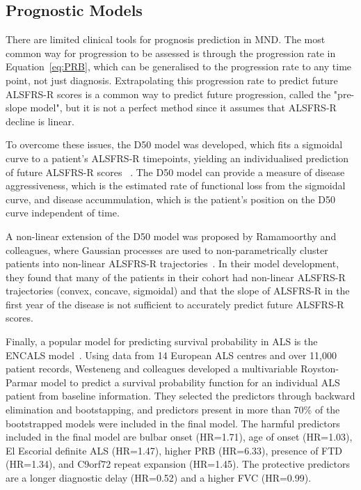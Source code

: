 \subsection{Prognostic Models}
There are limited clinical tools for prognosis prediction in MND. The most common way for progression to be assessed is through the progression rate in Equation~\ref{eq:PRB}, which can be generalised to the progression rate to any time point, not just diagnosis.
Extrapolating this progression rate to predict future ALSFRS-R scores is a common way to predict future progression, called the "pre-slope model", but it is not a perfect method since it assumes that ALSFRS-R decline is linear.

To overcome these issues, the D50 model was developed, which fits a sigmoidal curve to a patient's ALSFRS-R timepoints, yielding an individualised prediction of future ALSFRS-R scores
~\cite{poesenNeurofilamentMarkersALS2017, steinbachApplyingD50Disease2020}.
The D50 model can provide a measure of disease aggressiveness, which is the estimated rate of functional loss from the sigmoidal curve, and disease accummulation, which is the patient's position on the D50 curve independent of time.

A non-linear extension of the D50 model was proposed by Ramamoorthy and colleagues, where Gaussian processes are used to non-parametrically cluster patients into non-linear ALSFRS-R trajectories~\cite{ramamoorthyIdentifyingPatternsAmyotrophic2022}.
In their model development, they found that many of the patients in their cohort had non-linear ALSFRS-R trajectories (convex, concave, sigmoidal) and that the slope of ALSFRS-R in the first year of the disease is not sufficient to accurately predict future ALSFRS-R scores.

Finally, a popular model for predicting survival probability in ALS is the ENCALS model~\cite{westenengPrognosisPatientsAmyotrophic2018}.
Using data from 14 European ALS centres and over 11,000 patient records, Westeneng and colleagues developed a multivariable Royston-Parmar model to predict a survival probability function for an individual ALS patient from baseline information.
They selected the predictors through backward elimination and bootstapping, and predictors present in more than 70\% of the bootstrapped models were included in the final model.
The harmful predictors included in the final model are bulbar onset (HR=1.71), age of onset (HR=1.03), El Escorial definite ALS (HR=1.47), higher PRB (HR=6.33), presence of FTD (HR=1.34), and C9orf72 repeat expansion (HR=1.45).
The protective predictors are a longer diagnostic delay (HR=0.52) and a higher FVC (HR=0.99).

